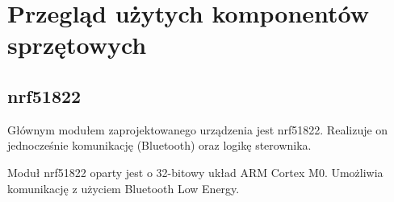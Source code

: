 \section{Przegląd użytych komponentów sprzętowych}

\subsection{nrf51822}

Głównym modułem zaprojektowanego urządzenia jest nrf51822. Realizuje on
jednocześnie komunikację (Bluetooth) oraz logikę sterownika.

Moduł nrf51822 oparty jest o 32-bitowy układ ARM Cortex M0. Umożliwia
komunikację z użyciem Bluetooth Low Energy.

